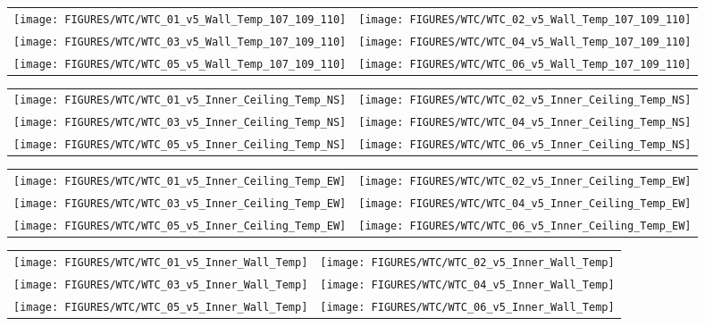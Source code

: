 \begin{figure}[p]
\begin{tabular*}{\textwidth}{l@{\extracolsep{\fill}}r}
\texttt{[image: FIGURES/WTC/WTC\_01\_v5\_Wall\_Temp\_107\_109\_110]} &
\texttt{[image: FIGURES/WTC/WTC\_02\_v5\_Wall\_Temp\_107\_109\_110]} \\
\texttt{[image: FIGURES/WTC/WTC\_03\_v5\_Wall\_Temp\_107\_109\_110]} &
\texttt{[image: FIGURES/WTC/WTC\_04\_v5\_Wall\_Temp\_107\_109\_110]} \\
\texttt{[image: FIGURES/WTC/WTC\_05\_v5\_Wall\_Temp\_107\_109\_110]} &
\texttt{[image: FIGURES/WTC/WTC\_06\_v5\_Wall\_Temp\_107\_109\_110]}
\end{tabular*}
\label{NIST_WTC_Wall_107_109_110}
\end{figure}

\begin{figure}[p]
\begin{tabular*}{\textwidth}{l@{\extracolsep{\fill}}r}
\texttt{[image: FIGURES/WTC/WTC\_01\_v5\_Inner\_Ceiling\_Temp\_NS]} &
\texttt{[image: FIGURES/WTC/WTC\_02\_v5\_Inner\_Ceiling\_Temp\_NS]} \\
\texttt{[image: FIGURES/WTC/WTC\_03\_v5\_Inner\_Ceiling\_Temp\_NS]} &
\texttt{[image: FIGURES/WTC/WTC\_04\_v5\_Inner\_Ceiling\_Temp\_NS]} \\
\texttt{[image: FIGURES/WTC/WTC\_05\_v5\_Inner\_Ceiling\_Temp\_NS]} &
\texttt{[image: FIGURES/WTC/WTC\_06\_v5\_Inner\_Ceiling\_Temp\_NS]}
\end{tabular*}
\label{NIST_WTC_Inner_Ceiling_NS}
\end{figure}

\begin{figure}[p]
\begin{tabular*}{\textwidth}{l@{\extracolsep{\fill}}r}
\texttt{[image: FIGURES/WTC/WTC\_01\_v5\_Inner\_Ceiling\_Temp\_EW]} &
\texttt{[image: FIGURES/WTC/WTC\_02\_v5\_Inner\_Ceiling\_Temp\_EW]} \\
\texttt{[image: FIGURES/WTC/WTC\_03\_v5\_Inner\_Ceiling\_Temp\_EW]} &
\texttt{[image: FIGURES/WTC/WTC\_04\_v5\_Inner\_Ceiling\_Temp\_EW]} \\
\texttt{[image: FIGURES/WTC/WTC\_05\_v5\_Inner\_Ceiling\_Temp\_EW]} &
\texttt{[image: FIGURES/WTC/WTC\_06\_v5\_Inner\_Ceiling\_Temp\_EW]}
\end{tabular*}
\label{NIST_WTC_Inner_Ceiling_EW}
\end{figure}

\begin{figure}[p]
\begin{tabular*}{\textwidth}{l@{\extracolsep{\fill}}r}
\texttt{[image: FIGURES/WTC/WTC\_01\_v5\_Inner\_Wall\_Temp]} &
\texttt{[image: FIGURES/WTC/WTC\_02\_v5\_Inner\_Wall\_Temp]} \\
\texttt{[image: FIGURES/WTC/WTC\_03\_v5\_Inner\_Wall\_Temp]} &
\texttt{[image: FIGURES/WTC/WTC\_04\_v5\_Inner\_Wall\_Temp]} \\
\texttt{[image: FIGURES/WTC/WTC\_05\_v5\_Inner\_Wall\_Temp]} &
\texttt{[image: FIGURES/WTC/WTC\_06\_v5\_Inner\_Wall\_Temp]}
\end{tabular*}
\label{NIST_WTC_Inner_Wall}
\end{figure}


